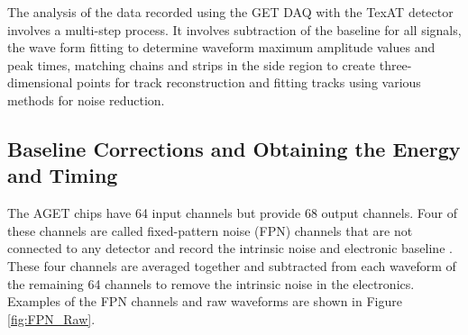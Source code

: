 \documentclass[final,number,sort&compress,5p,times,twocolumn]{elsarticle}
\begin{document}
The analysis of the data recorded using the GET DAQ with the TexAT detector involves a multi-step process. It involves subtraction of the baseline for all signals, the wave form fitting to determine waveform maximum amplitude values and peak times, matching chains and strips in the side region to create three-dimensional points for track reconstruction and fitting tracks using various methods for noise reduction.

\subsection{Baseline Corrections and Obtaining the Energy and Timing}

The AGET chips have 64 input channels but provide 68 output channels. Four of these channels are called fixed-pattern noise (FPN) channels that are not connected to any detector and record the intrinsic noise and electronic baseline \cite{Pollacco}. These four channels are averaged together and subtracted from each waveform of the remaining 64 channels to remove the intrinsic noise in the electronics. Examples of the FPN channels and raw waveforms are shown in Figure \ref{fig:FPN_Raw}.
\end{document}
